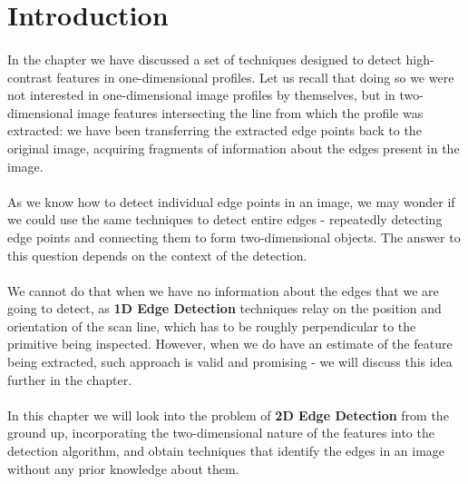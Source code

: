 \section{Introduction}

\paragraph*{}
In the  chapter we have discussed a set of techniques designed to detect high-contrast features in one-dimensional profiles. Let us recall that doing so we were not interested in one-dimensional image profiles by themselves, but in two-dimensional image features intersecting the line from which the profile was extracted: we have been transferring the extracted edge points back to the original image, acquiring fragments of information about the edges present in the image.

\paragraph*{}
As we know how to detect individual edge points in an image, we may wonder if we could use the same techniques to detect entire edges - repeatedly detecting edge points and connecting them to form two-dimensional objects. The answer to this question depends on the context of the detection.

\paragraph*{}
We cannot do that when we have no information about the edges that we are going to detect, as \textbf{1D Edge Detection} techniques relay on the position and orientation of the scan line, which has to be roughly perpendicular to the primitive being inspected. However, when we do have an estimate of the feature being extracted, such approach is valid and promising - we will discuss this idea further in the  chapter.

\paragraph*{}
In this chapter we will look into the problem of \textbf{2D Edge Detection} from the ground up, incorporating the two-dimensional nature of the features into the detection algorithm, and obtain techniques that identify the edges in an image without any prior knowledge about them.


